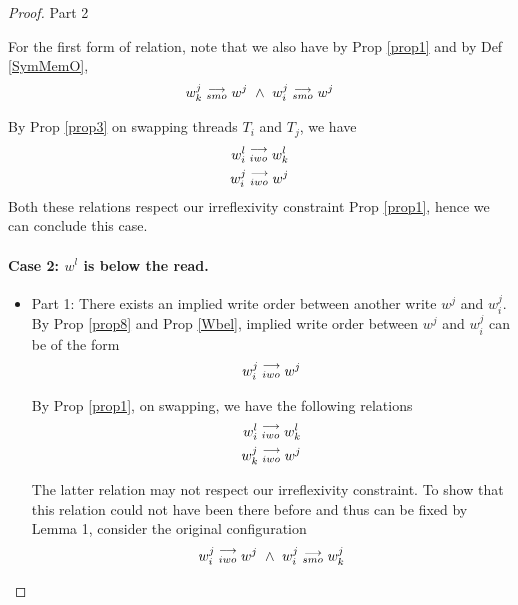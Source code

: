 \begin{proof}{Part 2}
\begin{itemize}
                        For the first form of relation, note that we also have by Prop \ref{prop1} and by Def \ref{SymMemO}, 
                        \begin{align*}
                            \reln{w_k^j}{smo}{w^j} \ \wedge \ \reln{w_i^j}{smo}{w^j}
                        \end{align*}

                        By Prop \ref{prop3} on swapping threads $T_i$ and $T_j$, we have 
                        \begin{align*}
                            w_i^l\stackrel{\longrightarrow}{_{iwo}}w_k^l \\ 
                            w_i^j\stackrel{\longrightarrow}{_{iwo}}w^j
                        \end{align*}
                        Both these relations respect our irreflexivity constraint Prop \ref{prop1}, hence we can conclude this case. 

                \end{itemize}

            \paragraph{Case 2: $w^l$ is below the read.}

                \begin{itemize}
                    \item Part 1: There exists an implied write order between another write $w^j$ and $w_i^j$.
                        By Prop \ref{prop8} and Prop \ref{Wbel}, implied write order between $w^j$ and $w_i^j$ can be of the form 
                        \begin{align*}
                            w_i^j\stackrel{\longrightarrow}{_{iwo}}w^j
                        \end{align*}

                        By Prop \ref{prop1}, on swapping, we have the following relations 
                        \begin{align*}
                            w_i^l\stackrel{\longrightarrow}{_{iwo}}w_k^l \\ 
                            w_k^j\stackrel{\longrightarrow}{_{iwo}}w^j
                        \end{align*}

                        The latter relation may not respect our irreflexivity constraint. To show that this relation could not have been there before and thus can be fixed by Lemma 1, consider the original configuration
                        \begin{align*}
                            \reln{w_i^j}{iwo}{w^j} \ \wedge \ \reln{w_i^j}{smo}{w_k^j}
                        \end{align*}


\end{itemize}
\end{proof}
